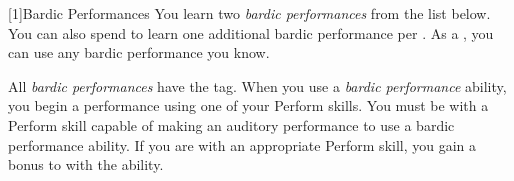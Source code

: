         [1]{Bardic Performances}
        You learn two \textit{bardic performances} from the list below.
        You can also spend  to learn one additional bardic performance per .
        As a , you can use any bardic performance you know.

        All \textit{bardic performances} have the  tag.
        When you use a \textit{bardic performance} ability, you begin a performance using one of your Perform skills.
        You must be  with a Perform skill capable of making an auditory performance to use a bardic performance ability.
        If you are  with an appropriate Perform skill, you gain a  bonus to  with the ability.

